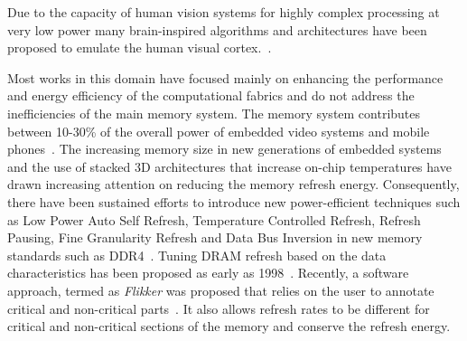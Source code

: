 
Due to the capacity of human vision systems for highly complex processing at very low power many brain-inspired algorithms and architectures have been proposed to emulate the human visual cortex.~\cite{Nere2011,Chen2014,Kestur2012}. %



Most works in this domain have focused mainly on enhancing the performance and energy efficiency of the computational fabrics and do not address the inefficiencies of the main memory system. The memory system contributes between 10-30\% of the overall power of embedded video systems and mobile phones~\cite{CarrollAaronHeiser2010}. 
The increasing memory size in new generations of embedded systems and the use of stacked 3D architectures that increase on-chip temperatures have drawn increasing attention on reducing the memory refresh energy. Consequently, there have been sustained efforts to introduce new power-efficient techniques such as Low Power Auto Self Refresh, Temperature Controlled Refresh, Refresh Pausing, Fine Granularity Refresh and Data Bus Inversion in new memory standards such as DDR4~\cite{jedec-sdram-standards}.  %
Tuning DRAM refresh based on the data characteristics has been proposed as early as 1998~\cite{islped98}. Recently, a software approach, termed as \emph{Flikker} was proposed that relies on the user to annotate critical and non-critical parts~\cite{Liu2011}. 
It also allows refresh rates to be different for critical and non-critical sections of the memory and conserve the refresh energy. 

